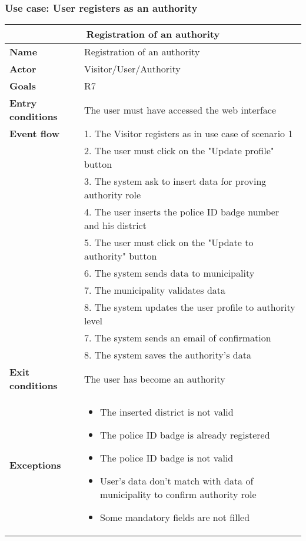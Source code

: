 \subsubsection{Use case: User registers as an authority}
\begin{center}
    \begin{tabular}{|p{3cm}|p{7cm}|}
        \multicolumn{2}{c}{\textbf{Registration of an authority}} \\
        \hline
        \textbf{Name} & Registration of an authority \\
        \hline
        \textbf{Actor} & Visitor/User/Authority \\
        \hline
        \textbf{Goals} & R7 \\
        \hline
        \textbf{Entry conditions} & The user must have accessed the web interface \\
        \hline
        \textbf{Event flow} & 1. The Visitor registers as in use case of scenario 1 \\ 
        & 2. The user must click on the "Update profile" button \\ 
        & 3. The system ask to insert data for proving authority role \\
        & 4. The user inserts the police ID badge number and his district \\
        & 5. The user must click on the "Update to authority" button \\ 
        & 6. The system sends data to municipality \\ 
        & 7. The municipality validates data \\
        & 8. The system updates the user profile to authority level \\
        & 7. The system sends an email of confirmation \\
        & 8. The system saves the authority's data \\
        \hline
        \textbf{Exit conditions} & The user has become an authority \\
        \hline
        \textbf{Exceptions}
        & \begin{itemize}
            \item The inserted district is not valid
            \item The police ID badge is already registered             
            \item The police ID badge is not valid
            \item User's data don't match with data of municipality to confirm authority role
            \item Some mandatory fields are not filled 
        \end{itemize} \\
        \hline
    \end{tabular}
\end{center}

